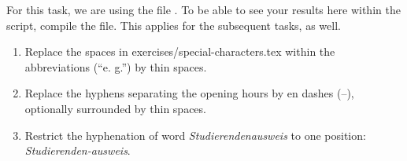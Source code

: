 For this task, we are using the file .
To be able to see your results here within the script,
compile the  file.
This applies for the subsequent tasks, as well.

\begin{enumerate}
	\item Replace the spaces in exercises/special-characters.tex within the abbreviations (\enquote{e. g.}) by thin spaces.
	\item Replace the hyphens separating the opening hours by en dashes (--), optionally surrounded by thin spaces.
	\item Restrict the hyphenation of word \emph{Studierendenausweis} to one position: \\\emph{Studierenden-ausweis}.
\end{enumerate}


